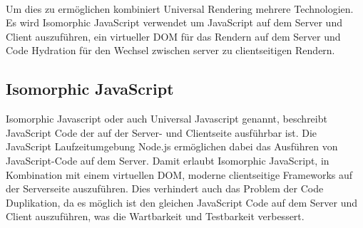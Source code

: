 \documentclass[runningheads]{llncs}
\begin{document}
\\
Um dies zu ermöglichen kombiniert Universal Rendering mehrere Technologien. 
Es wird Isomorphic JavaScript verwendet um JavaScript auf dem Server und Client auszuführen, 
ein virtueller DOM für das Rendern auf dem Server und 
Code Hydration für den Wechsel zwischen server zu clientseitigen Rendern. \cite{tarkus_alabes}

\subsection{Isomorphic JavaScript}
\label{subsec:Isomorphic JavaScript}
Isomorphic Javascript oder auch Universal Javascript genannt, 
beschreibt JavaScript Code der auf der Server- und Clientseite ausführbar ist. 
Die JavaScript Laufzeitumgebung Node.js ermöglichen dabei 
das Ausführen von JavaScript-Code auf dem Server. 
Damit erlaubt Isomorphic JavaScript, 
in Kombination mit einem virtuellen DOM, moderne clientseitige Frameworks auf der Serverseite auszuführen. 
Dies verhindert auch das Problem der Code Duplikation, 
da es möglich ist den gleichen JavaScript Code auf dem Server und Client auszuführen, 
was die Wartbarkeit und Testbarkeit verbessert. \cite{airbnbeng_2013}
\end{document}

